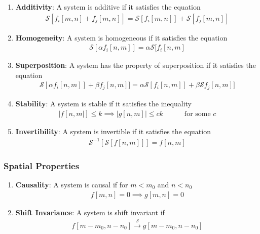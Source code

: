 \documentclass[letterpaper,12pt]{article}
\newcommand{\abs}[1]{\lvert#1\rvert}
\begin{document}
\begin{enumerate}
 \item \textbf{Additivity}: A system is additive if it satisfies the equation
       \begin{align}
        \mathcal{S}[f_i[m, n] + f_j[m, n]] = \mathcal{S}[f_i[m, n]] + \mathcal{S}[f_j[m, n]]
       \end{align}
 \item \textbf{Homogeneity}: A system is homogeneous if it satisfies the equation
       \begin{align}
        \mathcal{S}[\alpha f_i[n, m]] = \alpha\mathcal{S}[f_i[n, m]
       \end{align}
 \item \textbf{Superposition}: A system has the property of superposition if it satisfies the equation
       \begin{align}
        \mathcal{S}[\alpha f_i[n, m]] + \beta f_j[n, m]] = \alpha\mathcal{S}[f_i[n, m]] + \beta\mathcal{S}f_j[n, m]]
       \end{align}
 \item \textbf{Stability}: A system is stable if it satisfies the inequality
       \begin{align}
        \abs{f[n, m}] \leq k \implies 	\abs{g[n, m]}  \leq ck \quad\quad\quad \text{for some $c$}
       \end{align}
 \item \textbf{Invertibility}: A system is invertible if it satisfies the equation
       \begin{align}
        \mathcal{S}^{-1}[\mathcal{S}[f[n, m]]] = f[n, m]
       \end{align}
\end{enumerate}

\subsubsection{Spatial Properties}
\begin{enumerate}
 \item \textbf{Causality}: A system is causal if for $m < m_0$ and $n < n_0$
       \begin{align}
        f[m, n] = 0 \implies g[m, n] = 0
       \end{align}
 \item \textbf{Shift Invariance}: A system is shift invariant if
       \begin{align}
        f[m - m_0, n - n_0] \xrightarrow{\mathcal{S}} g[m - m_0, n - n_0]
       \end{align}
\end{enumerate}
\end{document}

